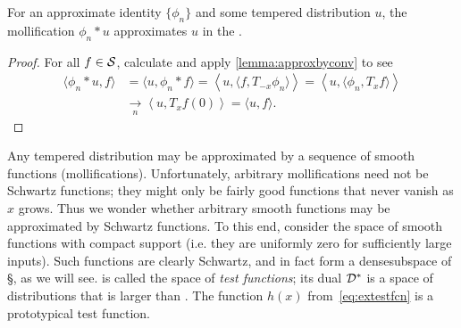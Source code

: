     \begin{lemma}
      \label{lemma:mollwithid}
      For an approximate identity $\{\phi_n\}$ and some tempered distribution $u$, the mollification $\phi_n*u$ approximates $u$ in the \ws.
    \end{lemma}
    \begin{proof}
      For all $f\in\S$, calculate and apply \cref{lemma:approxbyconv} to see
      \begin{align*}
        \langle \phi_n*u, f\rangle
        &= \langle u, \phi_n*f\rangle
        = \left\langle u, \langle f, T_{-x}\phi_n\rangle \right\rangle
        = \left\langle u, \langle \phi_n, T_{x}f\rangle \right\rangle
        \\&\underset{n}{\longrightarrow} \left\langle u, T_xf(0) \right\rangle
        = \langle u,f\rangle \text{.}
      \end{align*}
    \end{proof}

    Any tempered distribution may be approximated by a sequence of smooth functions (mollifications).
    Unfortunately, arbitrary mollifications need not be Schwartz functions; they might only be fairly good functions that never vanish as $x$ grows.
    Thus we wonder whether arbitrary smooth functions may be approximated by Schwartz functions.
    To this end, consider the space \D of smooth functions with compact support (i.e. they are uniformly zero for sufficiently large inputs).\footnotemark
    Such functions are clearly Schwartz, and in fact form a dense\footnotemark subspace of \S, as we will see.
    \D is called the space of \emph{test functions}; its dual $\D^*$ is a space of distributions that is larger than \SS.
    The function $h(x)$ from~\cref{eq:extestfcn} is a prototypical test function.
    
